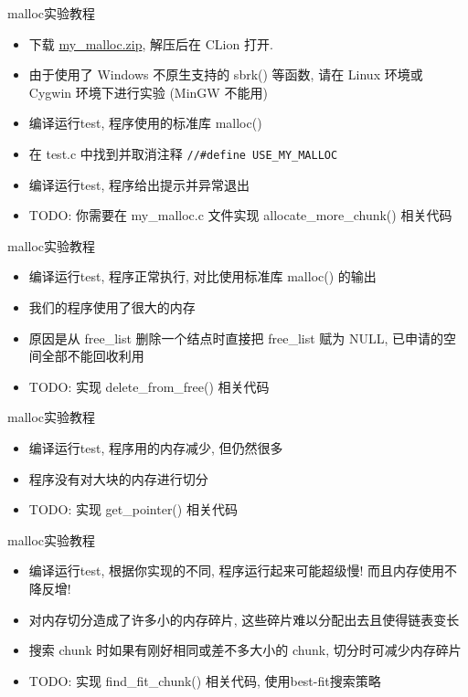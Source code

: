 \begin{frame}[fragile]{malloc实验教程}
    \begin{itemize}[<+- | alert@+>]
        \item 下载 \href{http://problemoverflow.top/download/my\_malloc.zip}{my\_malloc.zip}, 解压后在 CLion 打开.
        \item 由于使用了 Windows 不原生支持的 sbrk() 等函数, 请在 Linux 环境或 Cygwin 环境下进行实验 (MinGW 不能用)
        \item 编译运行test, 程序使用的标准库 malloc()
        \item 在 test.c 中找到并取消注释 \texttt{//\#define USE\_MY\_MALLOC}
        \item 编译运行test, 程序给出提示并异常退出
        \item TODO: 你需要在 my\_malloc.c 文件实现 allocate\_more\_chunk() 相关代码
    \end{itemize}
\end{frame}

\begin{frame}[fragile]{malloc实验教程}
    \begin{itemize}[<+- | alert@+>]
        \item 编译运行test, 程序正常执行, 对比使用标准库 malloc() 的输出
        \item 我们的程序使用了很大的内存
        \item 原因是从 free\_list 删除一个结点时直接把 free\_list 赋为 NULL, 已申请的空间全部不能回收利用
        \item TODO: 实现 delete\_from\_free() 相关代码
    \end{itemize}
\end{frame}

\begin{frame}[fragile]{malloc实验教程}
    \begin{itemize}[<+- | alert@+>]
        \item 编译运行test, 程序用的内存减少, 但仍然很多
        \item 程序没有对大块的内存进行切分
        \item TODO: 实现 get\_pointer() 相关代码
    \end{itemize}
\end{frame}

\begin{frame}[fragile]{malloc实验教程}
    \begin{itemize}[<+- | alert@+>]
        \item 编译运行test, 根据你实现的不同, 程序运行起来可能超级慢! 而且内存使用不降反增!
        \item 对内存切分造成了许多小的内存碎片, 这些碎片难以分配出去且使得链表变长
        \item 搜索 chunk 时如果有刚好相同或差不多大小的 chunk, 切分时可减少内存碎片
        \item TODO: 实现 find\_fit\_chunk() 相关代码, 使用best-fit搜索策略
    \end{itemize}
\end{frame}

